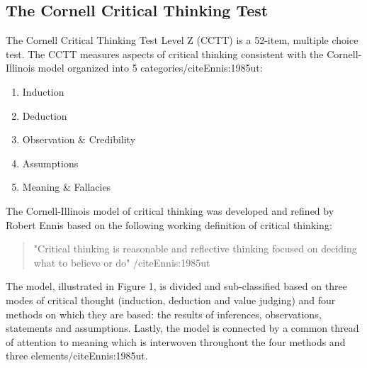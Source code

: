 \subsection{The Cornell Critical Thinking Test}

The Cornell Critical Thinking Test Level Z (CCTT) is a 52-item, multiple choice test. The CCTT measures aspects of critical thinking consistent with the Cornell-Illinois model organized into 5 categories/cite{Ennis:1985ut}:

\begin{enumerate}
\item Induction
\item Deduction
\item Observation & Credibility
\item Assumptions
\item Meaning & Fallacies
\end{enumerate}

The Cornell-Illinois model of critical thinking was developed and refined by Robert Ennis based on the following working definition of critical thinking:

\begin{quote}
"Critical thinking is reasonable and reflective thinking focused on deciding what to believe or do" /cite{Ennis:1985ut}
\end{quote}

The model, illustrated in Figure 1, is divided and sub-classified based on three modes of critical thought (induction, deduction and value judging) and four methods on which they are based: the results of inferences, observations, statements and assumptions. Lastly, the model is connected by a common thread of attention to meaning which is interwoven throughout the four methods and three elements/cite{Ennis:1985ut}. 

